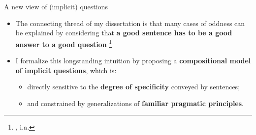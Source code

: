 \documentclass[10pt]{beamer}
\newcommand{\footciteia}[1]{\footnote{\cite{#1}, i.a.}}
\begin{document}
\begin{frame}{A new view of (implicit) questions}
	\begin{itemize}
		\item The connecting thread of my dissertation is that many cases of oddness can be explained by considering that \textbf{a good sentence has to be a good answer to a good question} \footciteia{Lewis1988, Rooth1985, Rooth1992, Roberts1996, Katzir2015,Buring2003,Zhang2022}\pause
		\item I formalize this longstanding intuition by proposing a \textbf{compositional model of implicit questions}, which is:\pause
			\begin{itemize}
				\item directly sensitive to the \textbf{degree of specificity} conveyed by sentences;\pause
				\item and constrained by generalizations of \textbf{familiar pragmatic principles}.
			\end{itemize}
	\end{itemize}
\end{frame}
\end{document}
